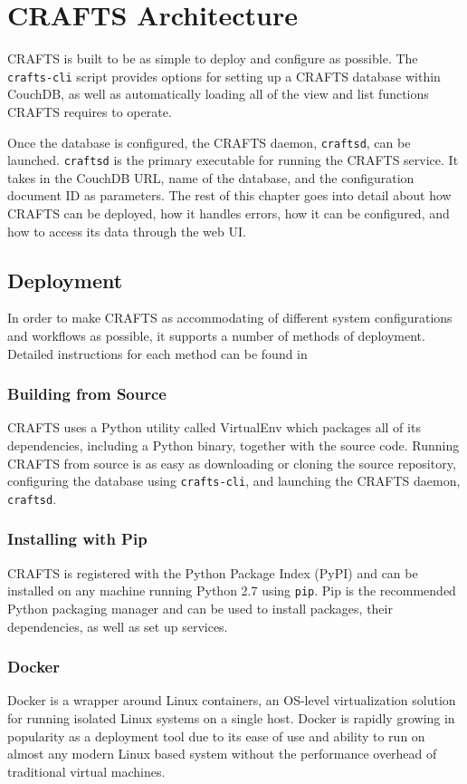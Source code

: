 \chapter{CRAFTS Architecture}
\label{ch:architecture}
CRAFTS is built to be as simple to deploy and configure as possible. The \texttt{crafts-cli} script provides options for setting up a CRAFTS database within CouchDB, as well as automatically loading all of the view and list functions CRAFTS requires to operate.

Once the database is configured, the CRAFTS daemon, \texttt{craftsd}, can be launched. \texttt{craftsd} is the primary executable for running the CRAFTS service. It takes in the CouchDB URL, name of the database, and the configuration document ID as parameters. The rest of this chapter goes into detail about how CRAFTS can be deployed, how it handles errors, how it can be configured, and how to access its data through the web UI.

\section{Deployment}
In order to make CRAFTS as accommodating of different system configurations and workflows as possible, it supports a number of methods of deployment. Detailed instructions for each method can be found in 

\subsection{Building from Source}
CRAFTS uses a Python utility called VirtualEnv which packages all of its dependencies, including a Python binary, together with the source code. Running CRAFTS from source is as easy as downloading or cloning the source repository, configuring the database using \texttt{crafts-cli}, and launching the CRAFTS daemon, \texttt{craftsd}.

\subsection{Installing with Pip}
CRAFTS is registered with the Python Package Index (PyPI) and can be installed on any machine running Python 2.7 using \texttt{pip}. Pip is the recommended Python packaging manager and can be used to install packages, their dependencies, as well as set up services.

\subsection{Docker}
Docker is a wrapper around Linux containers, an OS-level virtualization solution for running isolated Linux systems on a single host. Docker is rapidly growing in popularity as a deployment tool due to its ease of use and ability to run on almost any modern Linux based system without the performance overhead of traditional virtual machines.

